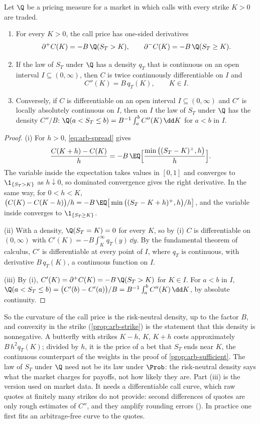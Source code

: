 \begin{proposition}\label{prop:arb-breeden-litzenberger}
Let $\Q$ be a pricing measure for a market in which calls with every strike $K>0$ are traded.
\begin{enumerate}[label=(\roman*)]
  \item For every $K>0$, the call price has one-sided derivatives
    \[
      \partial^+C(K)=-B\,\Q(S_T>K),\qquad \partial^-C(K)=-B\,\Q(S_T\ge K).
    \]
  \item If the law of $S_T$ under $\Q$ has a density $q_T$ that is continuous on an open
    interval $I\subseteq(0,\infty)$, then $C$ is twice continuously differentiable on $I$ and
    \[
      C''(K)=B\,q_T(K),\qquad K\in I .
    \]
  \item Conversely, if $C$ is differentiable on an open interval $I\subseteq(0,\infty)$ and
    $C'$ is locally absolutely continuous on $I$, then on $I$ the law of $S_T$ under $\Q$ has
    the density $C''/B$: $\Q(a<S_T\le b)=B^{-1}\int_a^bC''(K)\,\dd K$ for $a<b$ in $I$.
\end{enumerate}
\end{proposition}

\begin{proof}
(i) For $h>0$, \eqref{eq:arb-spread} gives
\[
  \frac{C(K+h)-C(K)}{h}=-B\,\EQ\Big[\frac{\min\big((S_T-K)^+,h\big)}{h}\Big].
\]
The variable inside the expectation takes values in $[0,1]$ and converges to
$\1_{\{S_T>K\}}$ as $h\downarrow0$, so dominated convergence gives the right derivative. In
the same way, for $0<h<K$,
$\big(C(K)-C(K-h)\big)/h=-B\,\EQ\big[\min\big((S_T-K+h)^+,h\big)/h\big]$, and the variable
inside converges to $\1_{\{S_T\ge K\}}$.

(ii) With a density, $\Q(S_T=K)=0$ for every $K$, so by (i) $C$ is differentiable on
$(0,\infty)$ with $C'(K)=-B\int_K^\infty q_T(y)\,\dd y$. By the fundamental theorem of
calculus, $C'$ is differentiable at every point of $I$, where $q_T$ is continuous, with
derivative $B\,q_T(K)$, a continuous function on $I$.

(iii) By (i), $C'(K)=\partial^+C(K)=-B\,\Q(S_T>K)$ for $K\in I$. For $a<b$ in $I$,
$\Q(a<S_T\le b)=\big(C'(b)-C'(a)\big)/B=B^{-1}\int_a^bC''(K)\,\dd K$, by absolute continuity.
\end{proof}

So the curvature of the call price is the risk-neutral density, up to the factor $B$, and
convexity in the strike (\cref{prop:arb-strike}) is the statement that this density is
nonnegative. A butterfly with strikes $K-h$, $K$, $K+h$ costs approximately $B\,h^2q_T(K)$;
divided by $h$, it is the price of a bet that $S_T$ ends near $K$, the continuous counterpart
of the weights in the proof of \cref{prop:arb-sufficient}. The law of $S_T$ under $\Q$ need not
be its law under $\Prob$: the risk-neutral density says what the market charges for payoffs,
not how likely they are. Part (iii) is the version used on market data. It needs a
differentiable call curve, which raw quotes at finitely many strikes do not provide: second
differences of quotes are only rough estimates of $C''$, and they amplify rounding errors
(). In practice one first fits an arbitrage-free curve to the quotes.

